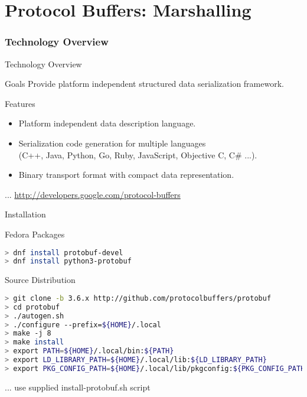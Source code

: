 \part{Protocol Buffers: Marshalling}


\section{Technology Overview}


\begin{frame}{Technology Overview}
    \begin{block}{Goals}
        Provide platform independent structured data serialization framework.
    \end{block}

    \bigskip

    \begin{block}{Features}
        \begin{itemize}
            \item Platform independent data description language.
            \item Serialization code generation for multiple languages \\
                  (C++, Java, Python, Go, Ruby, JavaScript, Objective C, C\# ...).
            \item Binary transport format with compact data representation.
        \end{itemize}
    \end{block}

    \bigskip

    \hfill ... \url{http://developers.google.com/protocol-buffers}
\end{frame}


\begin{frame}[fragile]{Installation}
    \begin{block}{Fedora Packages}
\begin{lstlisting}[language=bash,style=mini]
> dnf install protobuf-devel
> dnf install python3-protobuf
\end{lstlisting}
    \end{block}

    \bigskip

    \begin{block}{Source Distribution}
\begin{lstlisting}[language=bash,style=mini]
> git clone -b 3.6.x http://github.com/protocolbuffers/protobuf
> cd protobuf
> ./autogen.sh
> ./configure --prefix=${HOME}/.local
> make -j 8
> make install
> export PATH=${HOME}/.local/bin:${PATH}
> export LD_LIBRARY_PATH=${HOME}/.local/lib:${LD_LIBRARY_PATH}
> export PKG_CONFIG_PATH=${HOME}/.local/lib/pkgconfig:${PKG_CONFIG_PATH}
\end{lstlisting}
    \end{block}

    \bigskip

    \hfill ... use supplied install-protobuf.sh script
\end{frame}


